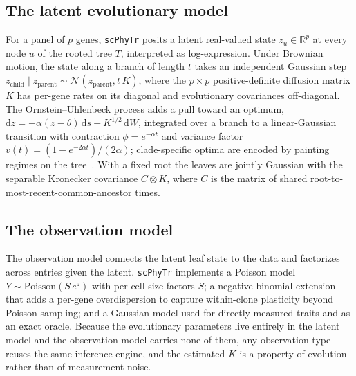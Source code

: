 \documentclass{article}
\newcommand{\RR}{\mathbb{R}}
\newcommand{\scphytr}{\texttt{scPhyTr}}
\begin{document}
\subsection*{The latent evolutionary model}
For a panel of $p$ genes, \scphytr{} posits a latent real-valued state $z_u\in\RR^p$ at
every node $u$ of the rooted tree $T$, interpreted as log-expression. Under Brownian
motion, the state along a branch of length $t$ takes an independent Gaussian step
$z_{\text{child}}\mid z_{\text{parent}}\sim\mathcal N(z_{\text{parent}}, t\,K)$, where the
$p\times p$ positive-definite diffusion matrix $K$ has per-gene rates on its diagonal and
evolutionary covariances off-diagonal. The Ornstein--Uhlenbeck process adds a pull toward
an optimum, $\mathrm dz = -\alpha(z-\theta)\,\mathrm ds + K^{1/2}\,\mathrm dW$, integrated
over a branch to a linear-Gaussian transition with contraction $\phi=e^{-\alpha t}$ and
variance factor $v(t)=(1-e^{-2\alpha t})/(2\alpha)$; clade-specific optima are encoded by
painting regimes on the tree~\cite{butler_king_2004}. With a fixed root the leaves are
jointly Gaussian with the separable Kronecker covariance $C\otimes K$, where $C$ is the
matrix of shared root-to-most-recent-common-ancestor times.

\subsection*{The observation model}
The observation model connects the latent leaf state to the data and factorizes across
entries given the latent. \scphytr{} implements a Poisson model $Y\sim\mathrm{Poisson}(S\,
e^{z})$ with per-cell size factors $S$; a negative-binomial extension that adds a per-gene
overdispersion to capture within-clone plasticity beyond Poisson sampling; and a Gaussian
model used for directly measured traits and as an exact oracle. Because the evolutionary
parameters live entirely in the latent model and the observation model carries none of
them, any observation type reuses the same inference engine, and the estimated $K$ is a
property of evolution rather than of measurement noise.
\end{document}
